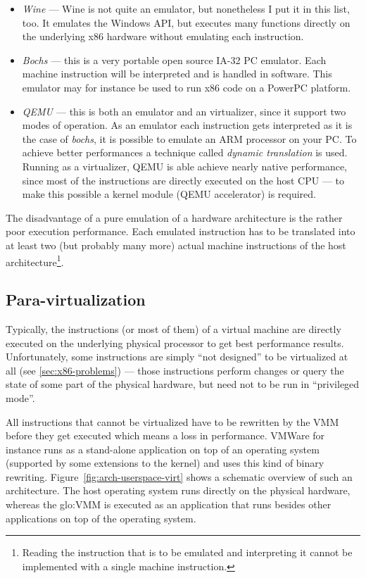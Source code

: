 \begin{itemize}
\item  \emph{Wine \cite{wine}}  --- Wine  is  not quite  an emulator,  but
  nonetheless I put it in this list, too. It emulates the Windows API, but
  executes many functions directly  on the underlying x86 hardware without
  emulating each instruction.
\item \emph{Bochs  \cite{bochs}} --- this  is a very portable  open source
  IA-32 PC emulator.  Each machine  instruction will be interpreted and is
  handled in software.  This emulator may for instance be  used to run x86
  code on a PowerPC platform.
\item  \emph{QEMU  \cite{qemu}} ---  this  is  both  an emulator  and  an
  virtualizer, since  it support  two modes of  operation. As  an emulator
  each instruction  gets interpreted  as it is  the case  of \emph{bochs},
  \eg it is possible  to emulate an ARM processor on  your PC. To achieve
  better  performances a  technique called  \emph{dynamic  translation} is
  used.   Running as  a virtualizer,  QEMU is  able achieve  nearly native
  performance, since most of the instructions are directly executed on the
  host CPU --- to make this possible a kernel module (QEMU accelerator) is
  required.
\end{itemize}

The disadvantage  of a  pure emulation of  a hardware architecture  is the
rather poor  execution performance.  Each  emulated instruction has  to be
translated  into at  least two  (but  probably many  more) actual  machine
instructions  of the  host  architecture\footnote{Reading the  instruction
  that is to be emulated and  interpreting it cannot be implemented with a
  single machine instruction.}.

\subsection{Para-virtualization}
\label{sec:paravirtualization}

Typically, the  instructions (or  most of them)  of a virtual  machine are
directly  executed  on  the  underlying  physical processor  to  get  best
performance  results.  Unfortunately, some  instructions are  simply ``not
designed'' to be virtualized at all (see \ref{sec:x86-problems}) --- those
instructions  perform changes  or  query the  state  of some  part of  the
physical hardware, but need not to be run in ``privileged mode''.

All instructions  that cannot be virtualized  have to be  rewritten by the
VMM before  they get executed which  means a loss  in performance.  VMWare
\cite{vmware} for instance runs as  a stand-alone application on top of an
operating system  (supported by  some extensions to  the kernel)  and uses
this kind of  binary rewriting. Figure~\ref{fig:arch-userspace-virt} shows
a schematic  overview of such  an architecture. The host  operating system
runs  directly on  the  physical hardware,  whereas  the \gls{glo:VMM}  is
executed as an application that  runs besides other applications on top of
the operating system.

